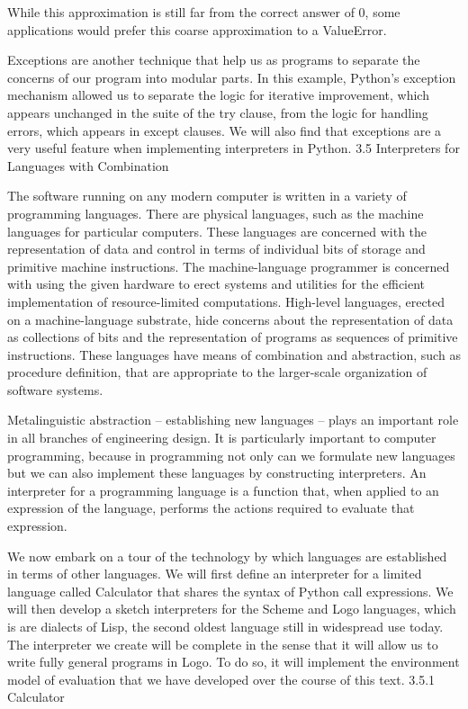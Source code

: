 \documentclass[letterpaper,10pt,dvipdfmx]{sphinxmanual}
\begin{document}
While this approximation is still far from the correct answer of 0, some applications would prefer this coarse approximation to a ValueError.

Exceptions are another technique that help us as programs to separate the concerns of our program into modular parts. In this example, Python's exception mechanism allowed us to separate the logic for iterative improvement, which appears unchanged in the suite of the try clause, from the logic for handling errors, which appears in except clauses. We will also find that exceptions are a very useful feature when implementing interpreters in Python.
3.5   Interpreters for Languages with Combination

The software running on any modern computer is written in a variety of programming languages. There are physical languages, such as the machine languages for particular computers. These languages are concerned with the representation of data and control in terms of individual bits of storage and primitive machine instructions. The machine-language programmer is concerned with using the given hardware to erect systems and utilities for the efficient implementation of resource-limited computations. High-level languages, erected on a machine-language substrate, hide concerns about the representation of data as collections of bits and the representation of programs as sequences of primitive instructions. These languages have means of combination and abstraction, such as procedure definition, that are appropriate to the larger-scale organization of software systems.

Metalinguistic abstraction -- establishing new languages -- plays an important role in all branches of engineering design. It is particularly important to computer programming, because in programming not only can we formulate new languages but we can also implement these languages by constructing interpreters. An interpreter for a programming language is a function that, when applied to an expression of the language, performs the actions required to evaluate that expression.

We now embark on a tour of the technology by which languages are established in terms of other languages. We will first define an interpreter for a limited language called Calculator that shares the syntax of Python call expressions. We will then develop a sketch interpreters for the Scheme and Logo languages, which is are dialects of Lisp, the second oldest language still in widespread use today. The interpreter we create will be complete in the sense that it will allow us to write fully general programs in Logo. To do so, it will implement the environment model of evaluation that we have developed over the course of this text.
3.5.1   Calculator
\end{document}
